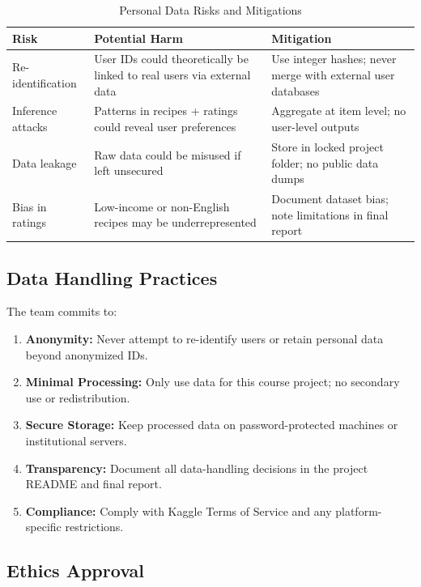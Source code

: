 \documentclass[11pt,a4paper]{article}
\begin{document}
\begin{table}[H]
    \centering
    \begin{tabular}{|p{3cm}|p{4.5cm}|p{4.5cm}|}
        \hline
        \textbf{Risk} & \textbf{Potential Harm} & \textbf{Mitigation} \\
        \hline
        Re-identification & User IDs could theoretically be linked to real users via external data & Use integer hashes; never merge with external user databases \\
        \hline
        Inference attacks & Patterns in recipes + ratings could reveal user preferences & Aggregate at item level; no user-level outputs \\
        \hline
        Data leakage & Raw data could be misused if left unsecured & Store in locked project folder; no public data dumps \\
        \hline
        Bias in ratings & Low-income or non-English recipes may be underrepresented & Document dataset bias; note limitations in final report \\
        \hline
    \end{tabular}
    \caption{Personal Data Risks and Mitigations}
    \label{tab:risks}
\end{table}

\subsection{Data Handling Practices}

The team commits to:

\begin{enumerate}
    \item \textbf{Anonymity:} Never attempt to re-identify users or retain personal data beyond anonymized IDs.
    \item \textbf{Minimal Processing:} Only use data for this course project; no secondary use or redistribution.
    \item \textbf{Secure Storage:} Keep processed data on password-protected machines or institutional servers.
    \item \textbf{Transparency:} Document all data-handling decisions in the project README and final report.
    \item \textbf{Compliance:} Comply with Kaggle Terms of Service and any platform-specific restrictions.
\end{enumerate}

\subsection{Ethics Approval}
\end{document}
